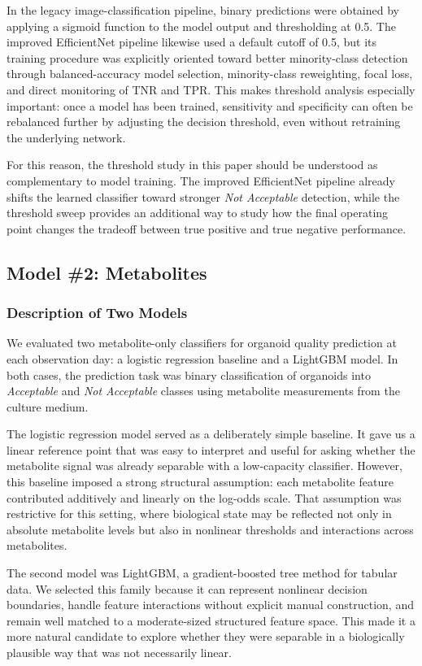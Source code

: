 \documentclass{article}
\begin{document}
In the legacy image-classification pipeline, binary predictions were obtained by applying a sigmoid function to the model output and thresholding at 0.5. The improved EfficientNet pipeline likewise used a default cutoff of 0.5, but its training procedure was explicitly oriented toward better minority-class detection through balanced-accuracy model selection, minority-class reweighting, focal loss, and direct monitoring of TNR and TPR. This makes threshold analysis especially important: once a model has been trained, sensitivity and specificity can often be rebalanced further by adjusting the decision threshold, even without retraining the underlying network.

For this reason, the threshold study in this paper should be understood as complementary to model training. The improved EfficientNet pipeline already shifts the learned classifier toward stronger \textit{Not Acceptable} detection, while the threshold sweep provides an additional way to study how the final operating point changes the tradeoff between true positive and true negative performance.

\subsection{Model \#2: Metabolites}
\subsubsection{Description of Two Models}

We evaluated two metabolite-only classifiers for organoid quality prediction at each observation day: a logistic regression baseline and a LightGBM model. In both cases, the prediction task was binary classification of organoids into \textit{Acceptable} and \textit{Not Acceptable} classes using metabolite measurements from the culture medium.

The logistic regression model served as a deliberately simple baseline. It gave us a linear reference point that was easy to interpret and useful for asking whether the metabolite signal was already separable with a low-capacity classifier. However, this baseline imposed a strong structural assumption: each metabolite feature contributed additively and linearly on the log-odds scale. That assumption was restrictive for this setting, where biological state may be reflected not only in absolute metabolite levels but also in nonlinear thresholds and interactions across metabolites.

The second model was LightGBM, a gradient-boosted tree method for tabular data. We selected this family because it can represent nonlinear decision boundaries, handle feature interactions without explicit manual construction, and remain well matched to a moderate-sized structured feature space. This made it a more natural candidate to explore whether they were separable in a biologically plausible way that was not necessarily linear.
\end{document}
